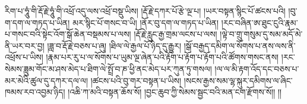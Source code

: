 རིག་པ་ཧཱུཾ་གི་རྡོ་རྗེ་ཧཱུཾ་གི་འཕྲོ་འདུ་ལས་འཕྲོ་བསྡུ་ཡིས། །རྡོ་རྗེ་དཀར་པོ་རྩེ་ལྔ་པ། །ཡར་བསྟན་སྙིང་པོ་ཚངས་པའི། །བུ་ག་དག་ལ་གཏད་པ་ཡིན། མར་སྙིང་པོ་གསང་བ་ཡི། །ནོར་བུ་དག་ལ་གཏད་པ་ཡིན། །རང་བཞིན་ཨ་ཐུང་ངུའི་རྣམ་པ་གསང་བའི་སྟེང་འོག་སྒོ་ཆེན་བསྡམས་པ་ལས། །རྡོ་རྗེ་རླུང་རྒྱ་གྲམ་ལངས་པ་ལས། །ལྟེ་བ་གྲུ་གསུམ་དུ་སམ་མདོ་མེ་ནི་ཡར་བར་བྱ། །ཟླ་བ་རྡོ་རྗེ་བཅས་པ་ཞུ། །ཐིལ་ལེ་རྒྱལ་པོ་ཉིད་དུ་རྒྱུར། །སྒོ་བརྒྱད་དམིག་ལ་སོགས་པ་ནས་ལས་ནི་འཕྲོས་པ་ཡིས། །རྣམ་པར་རུ་པ་ལ་སོགས་པ་ཡུམ་ལྔ་ཞེན་པའི་རྟོག་པ་རྟོག་པ་རྟོག་པའི་ཚོགས་གསང་ནས། །རང་སེམས་ཟླུམ་གོང་མ་ཤས་མེད་པ་ཐིག་ལེ་སྤྲོ་བ་ཎ་ཕྱི་ནང་མེད་པར་ཀུན་ཏུ་གསལ། །ལ་ལ་མི་རྟག་འོད་དང་བཅས་པ་མར་མེའི་ཚུལ་དུ་དཀར་དལ་ལ། །ཚངས་པའི་བུ་གར་བསྟན་པ་ཡིས། །སངས་རྒྱས་སམ་ལྷ་སྐུར་དམིགས་ལ་ཞིང་ཁམས་རབ་འབྱམ་ཉིད། །འཆི་ཀ་མའི་བསྟན་ཆོས་སོ། །བྱང་ཆུབ་ཀྱི་སེམས་སྦྱང་བའི་མན་ངག་རྫོགས་སོ།། །།